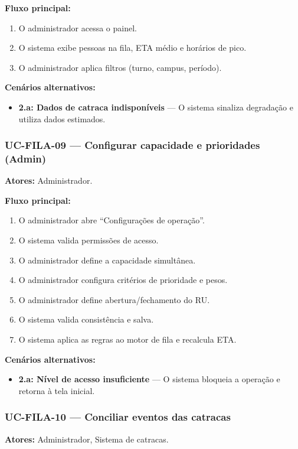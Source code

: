 \documentclass[12pt,a4paper]{article}
\begin{document}
\textbf{Fluxo principal:}
\begin{enumerate}
    \item O administrador acessa o painel.
    \item O sistema exibe pessoas na fila, ETA médio e horários de pico.
    \item O administrador aplica filtros (turno, campus, período).
\end{enumerate}

\textbf{Cenários alternativos:}
\begin{itemize}
    \item \textbf{2.a: Dados de catraca indisponíveis} — O sistema sinaliza degradação e utiliza dados estimados.
\end{itemize}

\subsubsection{UC-FILA-09 — Configurar capacidade e prioridades (Admin)}
\textbf{Atores:} Administrador.  

\textbf{Fluxo principal:}
\begin{enumerate}
    \item O administrador abre “Configurações de operação”.
    \item O sistema valida permissões de acesso.
    \item O administrador define a capacidade simultânea.
    \item O administrador configura critérios de prioridade e pesos.
    \item O administrador define abertura/fechamento do RU.
    \item O sistema valida consistência e salva.
    \item O sistema aplica as regras ao motor de fila e recalcula ETA.
\end{enumerate}

\textbf{Cenários alternativos:}
\begin{itemize}
    \item \textbf{2.a: Nível de acesso insuficiente} — O sistema bloqueia a operação e retorna à tela inicial.
\end{itemize}

\subsubsection{UC-FILA-10 — Conciliar eventos das catracas}
\textbf{Atores:} Administrador, Sistema de catracas.  
\end{document}
